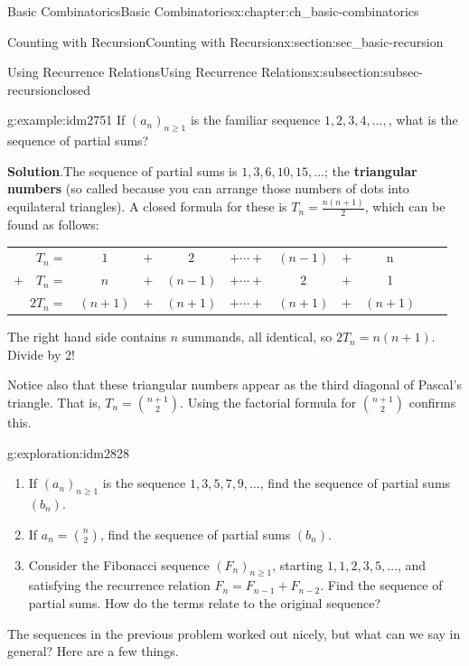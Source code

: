 \documentclass[oneside,10pt,]{book}
\newcommand{\terminology}[1]{\textbf{#1}}
\numberwithin{equation}{chapter}
\newcommand{\hrulethin}  {\noalign{\hrule height 0.04em}}
\begin{document}
\begin{chapterptx}{Basic Combinatorics}{}{Basic Combinatorics}{}{}{x:chapter:ch_basic-combinatorics}
\begin{sectionptx}{Counting with Recursion}{}{Counting with Recursion}{}{}{x:section:sec_basic-recursion}
\begin{subsectionptx}{Using Recurrence Relations}{}{Using Recurrence Relations}{}{}{x:subsection:subsec-recursionclosed}
\begin{example}{}{g:example:idm2751}
If \((a_n)_{n \ge 1}\) is the familiar sequence \(1, 2, 3, 4, \ldots,\), what is the sequence of partial sums?%
\par\smallskip%
\noindent\textbf{Solution}.\hypertarget{g:solution:idm2756}{}\quad{}The sequence of partial sums is \(1, 3, 6, 10, 15, \ldots\); the \terminology{triangular numbers} (so called because you can arrange those numbers of dots into equilateral triangles).  A closed formula for these is \(T_n = \frac{n(n+1)}{2}\), which can be found as follows:%
\begin{sidebyside}{1}{0}{0}{0}%
\begin{sbspanel}{1}%
{\centering%
\begin{tabular}{rccccccccc}
\(T_n  =\)&\(1\)&\(+\)&\(2\)&\(+ \cdots +\)&\((n-1)\)&\(+\)&n\tabularnewline[0pt]
\(+ \quad T_n  =\)&\(n\)&\(+\)&\((n-1)\)&\(+ \cdots +\)&\(2\)&\(+\)&1\tabularnewline\hrulethin
\(2T_n  =\)&\((n+1)\)&\(+\)&\((n+1)\)&\(+ \cdots +\)&\((n+1)\)&\(+\)&\((n+1)\)
\end{tabular}
\par}
\end{sbspanel}%
\end{sidebyside}%
\par
The right hand side contains \(n\) summands, all identical, so \(2T_n = n(n+1)\).  Divide by 2!%
\par
Notice also that these triangular numbers appear as the third diagonal of Pascal's triangle.  That is, \(T_n = \binom{n+1}{2}\).  Using the factorial formula for \(\binom{n+1}{2}\) confirms this.%
\end{example}
\begin{exploration}{}{g:exploration:idm2828}%
\begin{enumerate}[font=\bfseries,label=(\alph*),ref=\alph*]
\item{}If \((a_n)_{n \ge 1}\) is the sequence \(1, 3, 5, 7, 9, \ldots\), find the sequence of partial sums \((b_n)\).%
\item{}If \(a_n = \binom{n}{2}\), find the sequence of partial sums \((b_n)\).%
\item{}Consider the Fibonacci sequence \((F_n)_{n \ge 1}\), starting \(1, 1, 2, 3, 5, \ldots\), and satisfying the recurrence relation \(F_n = F_{n-1} + F_{n-2}\).  Find the sequence of partial sums.  How do the terms relate to the original sequence?%
\end{enumerate}
\end{exploration}
The sequences in the previous problem worked out nicely, but what can we say in general?  Here are a few things.%

\end{subsectionptx}
\end{sectionptx}
\end{chapterptx}
\end{document}
